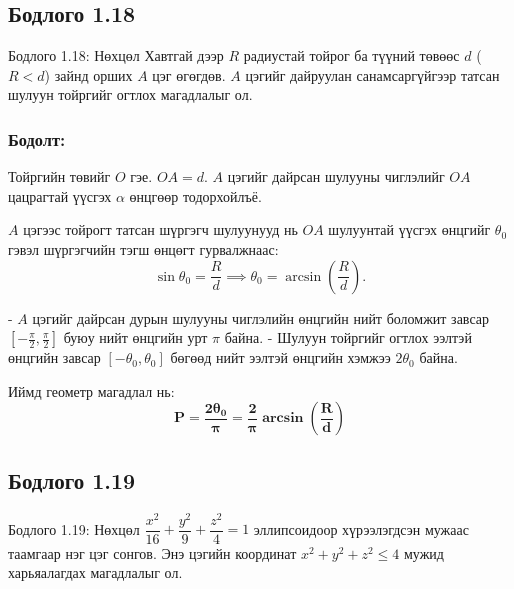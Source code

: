 \documentclass[11pt,a4paper]{article}
\begin{document}
\subsection*{Бодлого 1.18}

\begin{problembox}{Бодлого 1.18: Нөхцөл}
Хавтгай дээр $R$ радиустай тойрог ба түүний төвөөс $d$ ($R < d$) зайнд орших $A$ цэг өгөгдөв. $A$ цэгийг дайруулан санамсаргүйгээр татсан шулуун тойргийг огтлох магадлалыг ол.
\end{problembox}

\subsubsection*{Бодолт:}

Тойргийн төвийг $O$ гэе. $OA = d$.
$A$ цэгийг дайрсан шулууны чиглэлийг $OA$ цацрагтай үүсгэх $\alpha$ өнцгөөр тодорхойлъё.

$A$ цэгээс тойрогт татсан шүргэгч шулуунууд нь $OA$ шулуунтай үүсгэх өнцгийг $\theta_0$ гэвэл шүргэгчийн тэгш өнцөгт гурвалжнаас:
\[
  \sin \theta_0 = \frac{R}{d} \implies \theta_0 = \arcsin\left(\frac{R}{d}\right).
\]

- $A$ цэгийг дайрсан дурын шулууны чиглэлийн өнцгийн нийт боломжит завсар $[-\frac{\pi}{2}, \frac{\pi}{2}]$ буюу нийт өнцгийн урт $\pi$ байна.
- Шулуун тойргийг огтлох ээлтэй өнцгийн завсар $[-\theta_0, \theta_0]$ бөгөөд нийт ээлтэй өнцгийн хэмжээ $2\theta_0$ байна.

Иймд геометр магадлал нь:
\[
  \mathbf{P = \frac{2\theta_0}{\pi} = \frac{2}{\pi} \arcsin\left(\frac{R}{d}\right)}
\]

\vspace{0.8em}

\subsection*{Бодлого 1.19}

\begin{problembox}{Бодлого 1.19: Нөхцөл}
$\dfrac{x^2}{16} + \dfrac{y^2}{9} + \dfrac{z^2}{4} = 1$ эллипсоидоор хүрээлэгдсэн мужаас таамгаар нэг цэг сонгов. Энэ цэгийн координат $x^2 + y^2 + z^2 \le 4$ мужид харьяалагдах магадлалыг ол.
\end{problembox}
\end{document}
